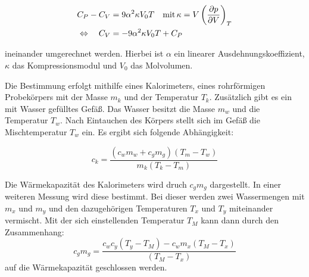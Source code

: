 \begin{align}
C_P-C_V&=9\alpha^2\kappa V_0 T \quad \text{mit} \, \kappa=V\left(\frac{\partial p}{\partial V}\right)_T \notag \\
\Leftrightarrow \quad C_V&=-9\alpha^2\kappa V_0 T+C_P \label{eq:umrechnung_cp_cv}
\end{align}

ineinander umgerechnet werden.
Hierbei ist $\alpha$ ein linearer Ausdehnungskoeffizient, $\kappa$ das Kompressionsmodul und %
$V_0$ das Molvolumen.

Die Bestimmung erfolgt mithilfe eines Kalorimeters,
eines rohrförmigen Probekörpers mit der Masse $m_k$ und der Temperatur %
$T_k$. Zusätzlich gibt es ein mit Wasser gefülltes Gefäß.
Das Wasser besitzt die Masse $m_w$ und die Temperatur $T_w$.
Nach Eintauchen des Körpers stellt sich im Gefäß die
Mischtemperatur $T_w$ ein.
Es ergibt sich folgende Abhängigkeit:

\begin{equation*}
\label{eq:zusammenhang_ck}
c_k=\frac{\left(c_wm_w+c_gm_g\right)\left(T_m-T_w\right)}{m_k\left(T_k-T_m\right)}
\end{equation*}

Die Wärmekapazität des Kalorimeters wird druch $c_gm_g$ dargestellt. %
In einer weiteren Messung wird diese bestimmt. %
Bei dieser werden zwei Wassermengen mit $m_x$ und $m_y$ und den
dazugehörigen Temperaturen $T_x$ und $T_y$ miteinander vermischt.
Mit der sich einstellenden Temperatur $T_M$ kann dann
durch den Zusammenhang:
\begin{equation}
\label{eq:zusammenhang_cgmg}
c_gm_g=\frac{c_wc_y\left(T_y-T_M\right)-c_wm_x\left(T_M-T_x\right)}{\left(T_M-T_x\right)}
\end{equation}
auf die Wärmekapazität geschlossen werden.

